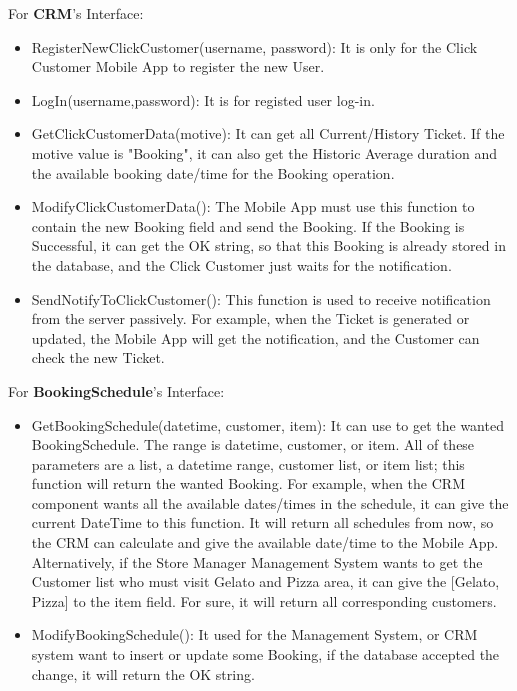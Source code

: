 \documentclass[a4paper,12pt]{report}
\begin{document}
For \textbf{CRM}'s Interface:
\begin{itemize}
	\item RegisterNewClickCustomer(username, password): It is only for the Click Customer Mobile App to register the new User.
	\item LogIn(username,password): It is for registed user log-in.
	\item GetClickCustomerData(motive): It can get all Current/History Ticket.
	If the motive value is "Booking", it can also get the Historic Average duration and the available booking date/time for the Booking operation.
	\item ModifyClickCustomerData(): The Mobile App must use this function to contain the new Booking field and send the Booking.
	If the Booking is Successful, it can get the OK string, so that this Booking is already stored in the database, and the Click Customer just waits for the notification.
	\item SendNotifyToClickCustomer(): This function is used to receive notification from the server passively.
	For example, when the Ticket is generated or updated, the Mobile App will get the notification, and the Customer can check the new Ticket.
\end{itemize}

\vspace{5mm}

For \textbf{BookingSchedule}'s Interface:
\begin{itemize}
	\item GetBookingSchedule(datetime, customer, item): It can use to get the wanted BookingSchedule.
			The range is datetime, customer, or item.
			All of these parameters are a list, a datetime range, customer list, or item list;
			this function will return the wanted Booking.
			For example, when the CRM component wants all the available dates/times in the schedule, it can give the current DateTime to this function.
			It will return all schedules from now, so the CRM can calculate and give the available date/time to the Mobile App.
			Alternatively, if the Store Manager Management System wants to get the Customer list who must visit Gelato and Pizza area, it can give the [Gelato, Pizza] to the item field. For sure, it will return all corresponding customers.
	\item ModifyBookingSchedule(): It used for the Management System, or CRM system want to insert or update some Booking, if the database accepted
			the change, it will return the OK string.
\end{itemize}
\end{document}
